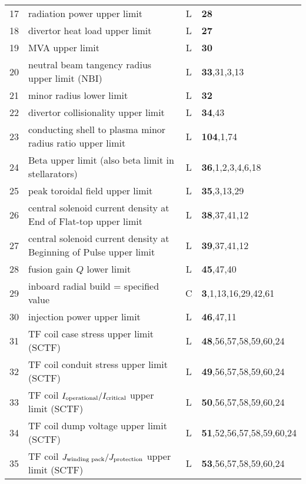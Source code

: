 \documentclass[11pt,a4paper]{report}
\begin{document}
\begin{table}[tbph]
\begin{center}
\begin{tabular}{||c|l|c|l||}
17  & radiation power upper limit                               & L    & \textbf{28} \\
18  & divertor heat load upper limit                            & L    & \textbf{27} \\
19  & MVA upper limit                                           & L    & \textbf{30} \\
20  & neutral beam tangency radius upper limit (NBI)            & L    & \textbf{33},31,3,13 \\
21  & minor radius lower limit                                  & L    & \textbf{32} \\
22  & divertor collisionality upper limit                       & L    & \textbf{34},43 \\
23  & conducting shell to plasma minor radius ratio upper limit & L    & \textbf{104},1,74 \\
24  & Beta upper limit (also beta limit in stellarators)        & L    & \textbf{36},1,2,3,4,6,18 \\
25  & peak toroidal field upper limit                           & L    & \textbf{35},3,13,29 \\
26  & central solenoid current density at End of Flat-top upper limit    & L    & \textbf{38},37,41,12 \\
27  & central solenoid current density at Beginning of Pulse upper limit & L    & \textbf{39},37,41,12 \\
28  & fusion gain $Q$ lower limit                               & L    & \textbf{45},47,40 \\
29  & inboard radial build = specified value                    & C    & \textbf{3},1,13,16,29,42,61 \\
30  & injection power upper limit                               & L    & \textbf{46},47,11 \\
31  & TF coil case stress upper limit (SCTF)                    & L    & \textbf{48},56,57,58,59,60,24 \\
32  & TF coil conduit stress upper limit (SCTF)                 & L    & \textbf{49},56,57,58,59,60,24 \\
33  & TF coil $I_{\mbox{\scriptsize operational}}/
I_{\mbox{\scriptsize critical}}$ upper limit (SCTF)                    & L    & \textbf{50},56,57,58,59,60,24 \\
34  & TF coil dump voltage upper limit (SCTF)                   & L    & \textbf{51},52,56,57,58,59,60,24 \\
35  & TF coil $J_{\mbox{\scriptsize winding pack}}/
J_{\mbox{\scriptsize protection}}$ upper limit (SCTF)                   & L    & \textbf{53},56,57,58,59,60,24 \\

\end{tabular}
\end{center}
\end{table}
\end{document}
